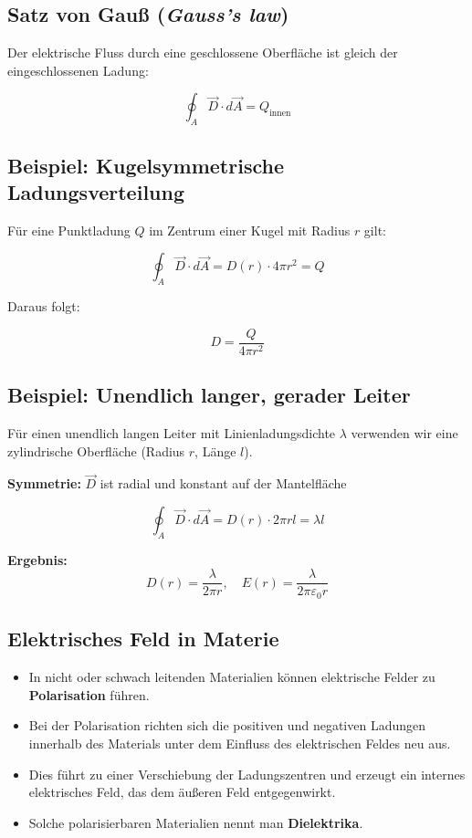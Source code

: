 \documentclass[
  11pt,
]{article}
\providecommand{\tightlist}{%
  \setlength{\itemsep}{0pt}\setlength{\parskip}{0pt}}
\begin{document}
\subsection{\texorpdfstring{Satz von Gauß (\emph{Gauss's
law})}{Satz von Gauß (Gauss's law)}}\label{satz-von-gauuxdf-gausss-law}

Der elektrische Fluss durch eine geschlossene Oberfläche ist gleich der
eingeschlossenen Ladung:

\[\oint_{A} \vec{D} \cdot d\vec{A} = Q_{\text{innen}}\]

\subsection{Beispiel: Kugelsymmetrische
Ladungsverteilung}\label{beispiel-kugelsymmetrische-ladungsverteilung}

Für eine Punktladung \(Q\) im Zentrum einer Kugel mit Radius \(r\) gilt:

\[\oint_{A} \vec{D} \cdot d\vec{A} = D(r) \cdot 4\pi r^2 = Q\]

Daraus folgt:

\[D = \frac{Q}{4\pi r^2}\]

\subsection{Beispiel: Unendlich langer, gerader
Leiter}\label{beispiel-unendlich-langer-gerader-leiter}

Für einen unendlich langen Leiter mit Linienladungsdichte \(\lambda\)
verwenden wir eine zylindrische Oberfläche (Radius \(r\), Länge \(l\)).

\textbf{Symmetrie:} \(\vec{D}\) ist radial und konstant auf der
Mantelfläche

\[\oint_{A} \vec{D} \cdot d\vec{A} = D(r) \cdot 2\pi r l = \lambda l\]

\textbf{Ergebnis:}
\[D(r) = \frac{\lambda}{2\pi r}, \quad E(r) = \frac{\lambda}{2\pi \varepsilon_0 r}\]

\subsection{Elektrisches Feld in
Materie}\label{elektrisches-feld-in-materie}

\begin{itemize}
\tightlist
\item
  In nicht oder schwach leitenden Materialien können elektrische Felder
  zu \textbf{Polarisation} führen.
\item
  Bei der Polarisation richten sich die positiven und negativen Ladungen
  innerhalb des Materials unter dem Einfluss des elektrischen Feldes neu
  aus.
\item
  Dies führt zu einer Verschiebung der Ladungszentren und erzeugt ein
  internes elektrisches Feld, das dem äußeren Feld entgegenwirkt.
\item
  Solche polarisierbaren Materialien nennt man \textbf{Dielektrika}.
\end{itemize}
\end{document}
